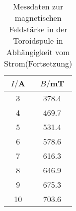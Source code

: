 \begin{table}
  \centering
  \caption{Messdaten zur magnetischen Feldstärke in der Toroidspule in Abhängigkeit
  vom Strom(Fortsetzung)}
  \label{tab:hysterese}
  \begin{tabular}{c c}
    \toprule
    $I/$A & $B/$mT\\
    \midrule
    3	  &  378.4\\
    4	  &  469.7\\
    5	  &  531.4\\
    6	  &  578.6\\
    7	  &  616.3\\
    8	  &  646.9\\
    9	  &  675.3\\
    10	&  703.6\\
    \bottomrule
  \end{tabular}
\end{table}
